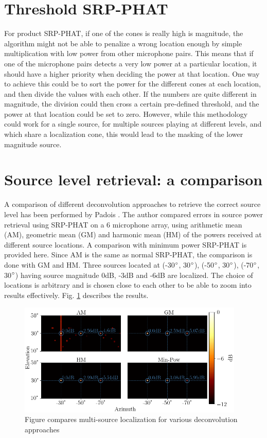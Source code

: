\section{Threshold SRP-PHAT}
For product SRP-PHAT, if one of the cones is really high is magnitude, the algorithm might not be able to penalize a wrong location enough by simple multiplication with low power from other microphone pairs. This means that if one of the microphone pairs detects a very low power at a particular location, it should have a higher priority when deciding the power at that location. One way to achieve this could be to sort the power for the different cones at each location, and then divide the values with each other. If the numbers are quite different in magnitude, the division could then cross a certain pre-defined threshold, and the power at that location could be set to zero. However, while this methodology could work for a single source, for multiple sources playing at different levels, and which share a localization cone, this would lead to the masking of the lower magnitude source.   

\section{Source level retrieval: a comparison}\label{srcLevel}
A comparison of different deconvolution approaches to retrieve the correct source level has been performed by Padois \cite{padois2016use}. The author compared errors in source power retrieval using SRP-PHAT on a 6 microphone array, using arithmetic mean (AM), geometric mean (GM) and harmonic mean (HM) of the powers received at different source locations. A comparison with minimum power SRP-PHAT is provided here. Since AM is the same as normal SRP-PHAT, the comparison is done with GM and HM. Three sources located at (-30$\degree$, 30$\degree$), (-50$\degree$, 30$\degree$), (-70$\degree$, 30$\degree$) having source magnitude 0dB, -3dB and -6dB are localized. The choice of locations is arbitrary and is chosen close to each other to be able to zoom into results effectively. Fig. \ref{fig:srcLevelComp} describes the results.

\begin{figure}[!ht]
\centering
\includegraphics[width=0.96\textwidth]{Figures/srcLvlComp.png}
\caption{Figure compares multi-source localization for various deconvolution approaches}
\label{fig:srcLevelComp}
\end{figure}

